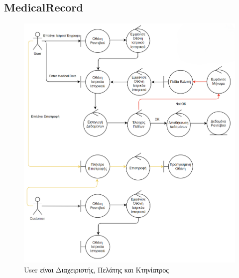 \documentclass[12pt,a4paper,twoside]{book}
\begin{document}
\subsection{MedicalRecord}
\begin{figure}[H]
    \centering
    \includegraphics[width=\textwidth]{Resources/Robustness Diagram/Medical_Record.png}
    \caption{User είναι Διαχειριστής, Πελάτης και Κτηνίατρος}\label{fig:robustness-medical-record}
\end{figure}
\end{document}
